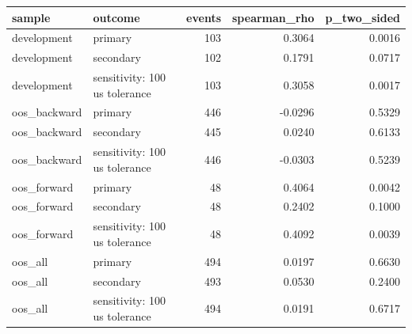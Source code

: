 \begin{tabular}{llrrr}
\toprule
sample & outcome & events & spearman_rho & p_two_sided \\
\midrule
development & primary & 103 & 0.3064 & 0.0016 \\
development & secondary & 102 & 0.1791 & 0.0717 \\
development & sensitivity: 100 us tolerance & 103 & 0.3058 & 0.0017 \\
oos_backward & primary & 446 & -0.0296 & 0.5329 \\
oos_backward & secondary & 445 & 0.0240 & 0.6133 \\
oos_backward & sensitivity: 100 us tolerance & 446 & -0.0303 & 0.5239 \\
oos_forward & primary & 48 & 0.4064 & 0.0042 \\
oos_forward & secondary & 48 & 0.2402 & 0.1000 \\
oos_forward & sensitivity: 100 us tolerance & 48 & 0.4092 & 0.0039 \\
oos_all & primary & 494 & 0.0197 & 0.6630 \\
oos_all & secondary & 493 & 0.0530 & 0.2400 \\
oos_all & sensitivity: 100 us tolerance & 494 & 0.0191 & 0.6717 \\
\bottomrule
\end{tabular}
